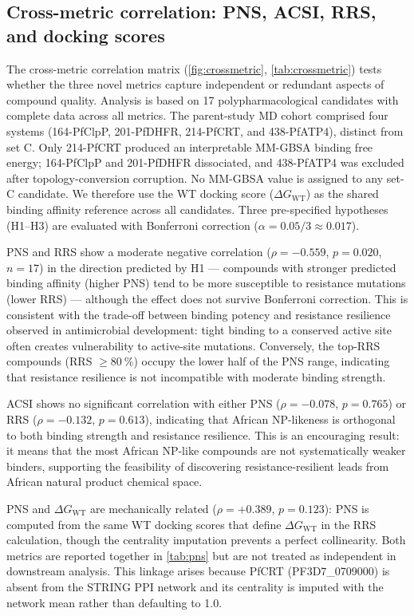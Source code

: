 \documentclass[11pt,a4paper]{article}
\begin{document}
\subsection{Cross-metric correlation: PNS, ACSI, RRS, and docking scores}

The cross-metric correlation matrix (\cref{fig:crossmetric}, \cref{tab:crossmetric}) tests whether the three novel metrics capture independent or redundant aspects of compound quality. Analysis is based on 17 polypharmacological candidates with complete data across all metrics. The parent-study MD cohort comprised four systems (164-PfClpP, 201-PfDHFR, 214-PfCRT, and 438-PfATP4), distinct from set C. Only 214-PfCRT produced an interpretable MM-GBSA binding free energy; 164-PfClpP and 201-PfDHFR dissociated, and 438-PfATP4 was excluded after topology-conversion corruption. No MM-GBSA value is assigned to any set-C candidate. We therefore use the WT docking score ($\Delta G_{\mathrm{WT}}$) as the shared binding affinity reference across all candidates. Three pre-specified hypotheses (H1--H3) are evaluated with Bonferroni correction ($\alpha = 0.05/3 \approx 0.017$).

PNS and RRS show a moderate negative correlation ($\rho = -0.559$, $p = 0.020$, $n = 17$) in the direction predicted by H1 --- compounds with stronger predicted binding affinity (higher PNS) tend to be more susceptible to resistance mutations (lower RRS) --- although the effect does not survive Bonferroni correction. This is consistent with the trade-off between binding potency and resistance resilience observed in antimicrobial development: tight binding to a conserved active site often creates vulnerability to active-site mutations. Conversely, the top-RRS compounds (RRS $\geq \qty{80}{\percent}$) occupy the lower half of the PNS range, indicating that resistance resilience is not incompatible with moderate binding strength.

ACSI shows no significant correlation with either PNS ($\rho = -0.078$, $p = 0.765$) or RRS ($\rho = -0.132$, $p = 0.613$), indicating that African NP-likeness is orthogonal to both binding strength and resistance resilience. This is an encouraging result: it means that the most African NP-like compounds are not systematically weaker binders, supporting the feasibility of discovering resistance-resilient leads from African natural product chemical space.

PNS and $\Delta G_{\mathrm{WT}}$ are mechanically related ($\rho = +0.389$, $p = 0.123$): PNS is computed from the same WT docking scores that define $\Delta G_{\mathrm{WT}}$ in the RRS calculation, though the centrality imputation prevents a perfect collinearity. Both metrics are reported together in \cref{tab:pns} but are not treated as independent in downstream analysis. This linkage arises because PfCRT (PF3D7\_0709000) is absent from the STRING PPI network and its centrality is imputed with the network mean rather than defaulting to 1.0.
\end{document}
